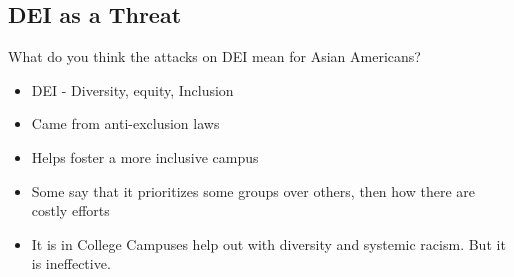 \documentclass{article}
\begin{document}
\subsection{DEI as a Threat}
What do you think the attacks on DEI mean for Asian Americans?

\begin{itemize}
  \item DEI - Diversity, equity, Inclusion
  \item Came from anti-exclusion laws
  \item Helps foster a more inclusive campus
  \item Some say that it prioritizes some groups over others, then how there are
    costly efforts
  \item It is in College Campuses help out with diversity and systemic racism.
    But it is ineffective.
\end{itemize}
\end{document}
